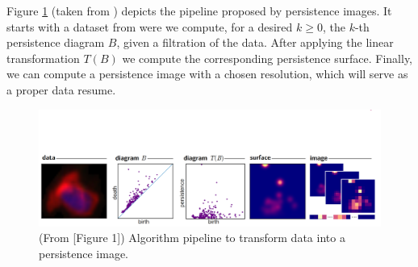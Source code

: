 \begin{example}
    Figure \ref{fig:persistent-images} (taken from \cite{adams}) depicts the pipeline proposed by persistence images. It starts with a dataset from were we compute, for a desired $k \geq 0 $, the $k$-th persistence diagram $ B $, given a filtration of the data. After applying the linear transformation $T(B)$ we compute the corresponding persistence surface. Finally, we can compute a persistence image with a chosen resolution, which will serve as a proper data resume.        
    \begin{figure}[H]
        \centering
        \includegraphics[width=\linewidth, trim=0 0 0 200, clip]{figures/persistent-images.png}
        \caption[Persistence images pipeline]{(From \cite{adams}[Figure 1]) Algorithm pipeline to transform data into a persistence image.}
        \label{fig:persistent-images}
    \end{figure}
\end{example}

